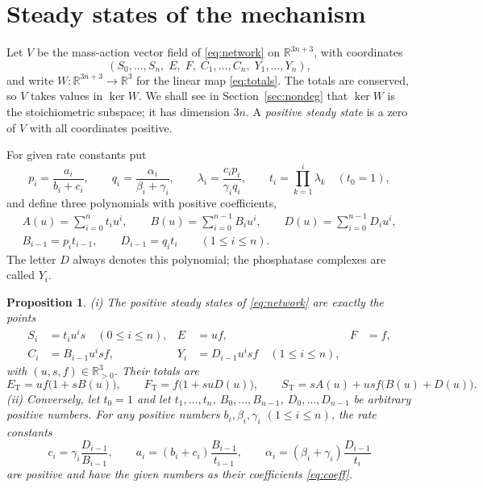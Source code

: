 \documentclass[11pt]{article}
\theoremstyle{plain}
\newtheorem{proposition}[theorem]{Proposition}
\theoremstyle{definition}
\theoremstyle{remark}
\numberwithin{equation}{section}
\newcommand{\R}{\mathbb R}
\newcommand{\ET}{E_{\mathrm T}}
\newcommand{\FT}{F_{\mathrm T}}
\newcommand{\ST}{S_{\mathrm T}}
\begin{document}
\section{Steady states of the mechanism}\label{sec:model}
Let \(V\) be the mass-action vector field of \eqref{eq:network} on \(\R^{3n+3}\), with
coordinates
\[
 (S_0,\dots,S_n,\;E,\;F,\;C_1,\dots,C_n,\;Y_1,\dots,Y_n),
\]
and write \(W\colon\R^{3n+3}\to\R^3\) for the linear map \eqref{eq:totals}. The totals are conserved, so \(V\)
takes values in \(\ker W\). We shall see in Section~\ref{sec:nondeg} that \(\ker W\) is the
stoichiometric subspace; it has dimension \(3n\). A \emph{positive steady state} is a zero of
\(V\) with all coordinates positive.

For given rate constants put
\begin{equation}\label{eq:pq}
 p_i=\frac{a_i}{b_i+c_i},\qquad q_i=\frac{\alpha_i}{\beta_i+\gamma_i},\qquad
 \lambda_i=\frac{c_ip_i}{\gamma_iq_i},\qquad t_i=\prod_{k=1}^{i}\lambda_k\quad(t_0=1),
\end{equation}
and define three polynomials with positive coefficients,
\begin{equation}\label{eq:coeff}
\begin{gathered}
 A(u)=\sum_{i=0}^n t_i u^i,\qquad
 B(u)=\sum_{i=0}^{n-1} B_i u^i,\qquad
 D(u)=\sum_{i=0}^{n-1} D_i u^i,\\
 B_{i-1}=p_it_{i-1},\qquad D_{i-1}=q_it_i\qquad(1\le i\le n).
\end{gathered}
\end{equation}
The letter \(D\) always denotes this polynomial; the phosphatase complexes are called \(Y_i\).

\begin{proposition}\label{prop:param}
\textup{(i)} The positive steady states of \eqref{eq:network} are exactly the points
\begin{equation}\label{eq:states}
\begin{aligned}
 S_i&=t_i u^i s \quad(0\le i\le n),& E&=uf,& F&=f,\\
 C_i&=B_{i-1}u^i sf,& Y_i&=D_{i-1}u^i sf \quad(1\le i\le n),
\end{aligned}
\end{equation}
with \((u,s,f)\in\R^3_{>0}\). Their totals are
\begin{equation}\label{eq:totalcoords}
 \ET=uf\bigl(1+sB(u)\bigr),\qquad \FT=f\bigl(1+suD(u)\bigr),\qquad
 \ST=sA(u)+usf\bigl(B(u)+D(u)\bigr).
\end{equation}
\textup{(ii)} Conversely, let \(t_0=1\) and let \(t_1,\dots,t_n\), \(B_0,\dots,B_{n-1}\),
\(D_0,\dots,D_{n-1}\) be arbitrary positive numbers. For any positive numbers
\(b_i,\beta_i,\gamma_i\) \((1\le i\le n)\), the rate constants
\begin{equation}\label{eq:ratesgeneral}
 c_i=\gamma_i\frac{D_{i-1}}{B_{i-1}},\qquad
 a_i=(b_i+c_i)\frac{B_{i-1}}{t_{i-1}},\qquad
 \alpha_i=(\beta_i+\gamma_i)\frac{D_{i-1}}{t_i}
\end{equation}
are positive and have the given numbers as their coefficients \eqref{eq:coeff}.
\end{proposition}
\end{document}
